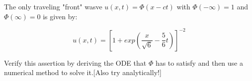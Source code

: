 The only traveling "front" wasve $u(x,t) = \Phi(x - ct)$ with $\Phi(-\infty)=1$ and $\Phi(\infty)=0$
is given by:

$$u(x,t) = [1+exp(\frac{x}{\sqrt{6}} - \frac56t)]^{-2}$$

Verify this assertion by deriving the ODE that $\Phi$ has to satisfy and then use a numerical method to
solve it.[Also try analytically!]\\

\begin{solution}\renewcommand{\qedsymbol}{}\ \\
\end{solution}

\newpage

\newpage